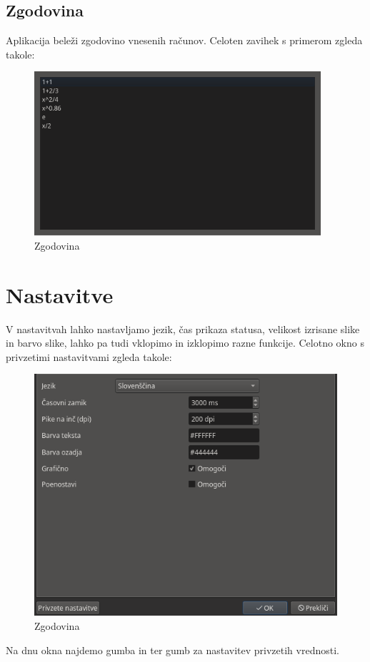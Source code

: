 \documentclass[12pt]{report}
\begin{document}
		\parbox{\textwidth}{
			\subsection{Zgodovina}
			Aplikacija beleži zgodovino vnesenih računov.
			Celoten zavihek s primerom zgleda takole:
			\begin{figure}[H]
				\centering
				\includegraphics[height=230px]{mw_hist.png}
				\caption{Zgodovina}
				\label{fig:mw_hist}
			\end{figure}}
	\parbox{\textwidth}{
	\section{Nastavitve}
		V nastavitvah lahko nastavljamo jezik, čas prikaza statusa, velikost izrisane slike in barvo slike, lahko pa tudi vklopimo in izklopimo razne funkcije.
		Celotno okno s privzetimi nastavitvami zgleda takole:
		\begin{figure}[H]
			\centering
			\includegraphics{settings.png}
			\caption{Zgodovina}
			\label{fig:settings}
		\end{figure}
		Na dnu okna najdemo gumba  in  ter gumb za nastavitev privzetih vrednosti.}
\end{document}
